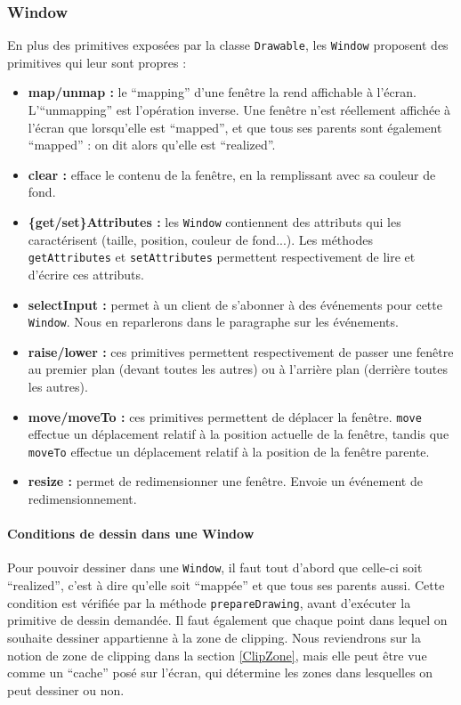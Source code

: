 \subsubsection{Window}

En plus des primitives exposées par la classe \verb|Drawable|, les \verb|Window| proposent des primitives qui leur sont propres :
\begin{itemize}
  \item \textbf{map/unmap :} le ``mapping'' d'une fenêtre la rend affichable à l'écran. L'``unmapping'' est l'opération inverse. Une fenêtre n'est réellement affichée à l'écran que lorsqu'elle est ``mapped'', et que tous ses parents sont également ``mapped'' : on dit alors qu'elle est ``realized''.
  \item \textbf{clear :} efface le contenu de la fenêtre, en la remplissant avec sa couleur de fond.
  \item \textbf{\{get/set\}Attributes :} les \verb|Window| contiennent des attributs qui les caractérisent (taille, position, couleur de fond...). Les méthodes \verb|getAttributes| et \verb|setAttributes| permettent respectivement de lire et d'écrire ces attributs.
  \item \textbf{selectInput :} permet à un client de s'abonner à des événements pour cette \verb|Window|. Nous en reparlerons dans le paragraphe sur les événements.
  \item \textbf{raise/lower :} ces primitives permettent respectivement de passer une fenêtre au premier plan (devant toutes les autres) ou à l'arrière plan (derrière toutes les autres).
  \item \textbf{move/moveTo :} ces primitives permettent de déplacer la fenêtre. \verb|move| effectue un déplacement relatif à la position actuelle de la fenêtre, tandis que \verb|moveTo| effectue un déplacement relatif à la position de la fenêtre parente.
  \item \textbf{resize :} permet de redimensionner une fenêtre. Envoie un événement de redimensionnement.
\end{itemize}

\paragraph{Conditions de dessin dans une Window}
Pour pouvoir dessiner dans une \verb|Window|, il faut tout d'abord que celle-ci soit ``realized'', c'est à dire qu'elle soit ``mappée'' et que tous ses parents aussi. Cette condition est vérifiée par la méthode \verb|prepareDrawing|, avant d'exécuter la primitive de dessin demandée. Il faut également que chaque point dans lequel on souhaite dessiner appartienne à la zone de clipping. Nous reviendrons sur la notion de zone de clipping dans la section \ref{ClipZone}, mais elle peut être vue comme un ``cache'' posé sur l'écran, qui détermine les zones dans lesquelles on peut dessiner ou non.

